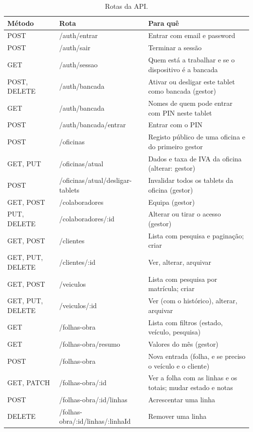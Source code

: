 \documentclass[a4paper,12pt]{article}
\begin{document}
\begin{table}[htbp]
\centering
\small
\begin{tabularx}{\textwidth}{@{}lp{5.4cm}L@{}}
\toprule
\textbf{Método} & \textbf{Rota} & \textbf{Para quê} \\
\midrule
POST & /auth/entrar & Entrar com email e password \\
POST & /auth/sair & Terminar a sessão \\
GET & /auth/sessao & Quem está a trabalhar e se o dispositivo é a bancada \\
POST, DELETE & /auth/bancada & Ativar ou desligar este tablet como bancada (gestor) \\
GET & /auth/bancada & Nomes de quem pode entrar com PIN neste tablet \\
POST & /auth/bancada/entrar & Entrar com o PIN \\
\midrule
POST & /oficinas & Registo público de uma oficina e do primeiro gestor \\
GET, PUT & /oficinas/atual & Dados e taxa de IVA da oficina (alterar: gestor) \\
POST & /oficinas/atual/desligar-tablets & Invalidar todos os tablets da oficina (gestor) \\
\midrule
GET, POST & /colaboradores & Equipa (gestor) \\
PUT, DELETE & /colaboradores/:id & Alterar ou tirar o acesso (gestor) \\
GET, POST & /clientes & Lista com pesquisa e paginação; criar \\
GET, PUT, DELETE & /clientes/:id & Ver, alterar, arquivar \\
GET, POST & /veiculos & Lista com pesquisa por matrícula; criar \\
GET, PUT, DELETE & /veiculos/:id & Ver (com o histórico), alterar, arquivar \\
\midrule
GET & /folhas-obra & Lista com filtros (estado, veículo, pesquisa) \\
GET & /folhas-obra/resumo & Valores do mês (gestor) \\
POST & /folhas-obra & Nova entrada (folha, e se preciso o veículo e o cliente) \\
GET, PATCH & /folhas-obra/:id & Ver a folha com as linhas e os totais; mudar estado e notas \\
POST & /folhas-obra/:id/linhas & Acrescentar uma linha \\
DELETE & /folhas-obra/:id/linhas/:linhaId & Remover uma linha \\
\bottomrule
\end{tabularx}
\caption{Rotas da API.}
\label{tab:rotas}
\end{table}
\end{document}
